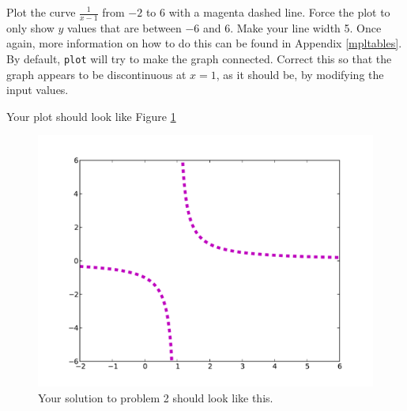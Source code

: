 	
\begin{problem} Plot the curve $\frac{1}{x-1}$ from $-2$ to $6$ with a 
magenta dashed line. Force the plot to only show $y$ values that are between $-6$ and $6$. Make your line width 5. Once again, more information on how to do this can be found in Appendix \ref{mpltables}. By default, \texttt{plot} will try to make the graph connected. Correct this so that the graph appears to be discontinuous at $x=1$, as it should be, by modifying the input values. 

Your plot should look like Figure \ref{mpl:problem2} 
\end{problem}

\begin{figure}
\includegraphics[width=\textwidth]{prob2.pdf}
\caption{Your solution to problem 2 should look like this.}
\label{mpl:problem2} 
\end{figure}

